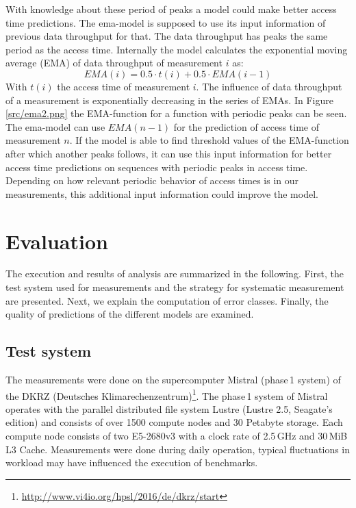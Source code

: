 \documentclass{superfri}
\begin{document}
With knowledge about these period of peaks a model could make better access time predictions.
The ema-model is supposed to use its input information of previous data throughput for that.
The data throughput has peaks the same period as the access time.
Internally the model calculates the exponential moving average (EMA) of data throughput of measurement $i$ as:
\begin{equation}
EMA(i) = 0.5 \cdot t(i)+ 0.5 \cdot EMA(i-1)
\end{equation}
With $t(i)$ the access time of measurement $i$.
The influence of data throughput of a measurement is exponentially decreasing in the series of EMAs.
In Figure \ref{src/ema2.png} the EMA-function for a function with periodic peaks can be seen.
\\
The ema-model can use $EMA(n-1)$ for the prediction of access time of measurement $n$.
If the model is able to find threshold values of the EMA-function after which another peaks follows, it can use this input information for better access time predictions on sequences with periodic peaks in access time. Depending on how relevant periodic behavior of access times is in our measurements, this additional input information could improve the model.\medskip

\section{Evaluation}
\label{evaluation}
The execution and results of analysis are summarized in the following.
First, the test system used for measurements and the strategy for systematic measurement are presented.
Next, we explain the computation of error classes.
Finally, the quality of predictions of the different models are examined.

\subsection{Test system}
The measurements were done on the supercomputer Mistral (phase\,1 system) of the DKRZ (Deutsches Klimarechenzentrum)\footnote{\url{http://www.vi4io.org/hpsl/2016/de/dkrz/start}}.
The phase\,1 system of Mistral operates with the parallel distributed file system Lustre (Lustre 2.5, Seagate's edition) and consists of over 1500 compute nodes and 30 Petabyte storage.
Each compute node consists of two E5-2680v3 with a clock rate of 2.5\,GHz and 30\,MiB L3 Cache.
Measurements were done during daily operation, typical fluctuations in workload may have influenced the execution of benchmarks.
\end{document}
